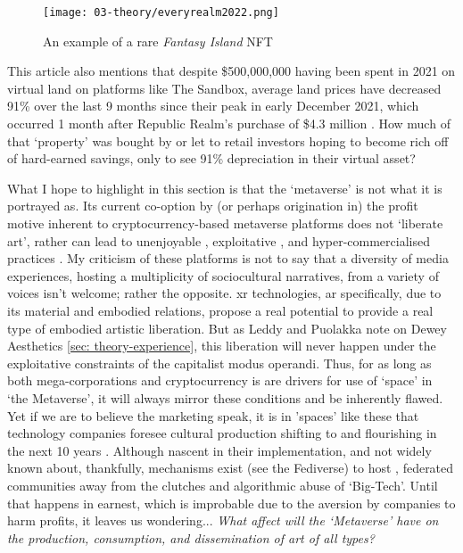 \begin{wrapfigure}{L}{0.45\textwidth}
    \vspace{-\intextsep}
    \begin{minipage}{0.95\linewidth}
        \texttt{[image: 03-theory/everyrealm2022.png]}
        \captionsetup{justification=justified}
        \caption{An example of a rare \textit{Fantasy Island} NFT \citep[from][]{everyrealm2022}}\label{fig: everyrealm2022}
    \end{minipage}
    \hfill
\end{wrapfigure}

This article also mentions that despite \$500,000,000 having been spent in 2021 on virtual land on platforms like The Sandbox, average land prices have decreased 91\% over the last 9 months since their peak in early December 2021, which occurred 1 month after Republic Realm's purchase of \$4.3 million \citep[]{kane2022}. How much of that `property' was bought by or let to retail investors hoping to become rich off of hard-earned savings, only to see 91\% depreciation in their virtual asset? 

What I hope to highlight in this section is that the `metaverse' is not what it is portrayed as. Its current co-option by (or perhaps origination in) the profit motive inherent to cryptocurrency-based metaverse platforms does not `liberate art', rather can lead to unenjoyable \citep{dejesus2022,delic2022}, exploitative , and hyper-commercialised practices \citep[]{ledesma2021,ongwesojr.2022,gach2022}. My criticism of these platforms is not to say that a diversity of media experiences, hosting a multiplicity of sociocultural narratives, from a variety of voices isn't welcome; rather the opposite. \gls{xr} technologies, \gls{ar} specifically, due to its material and embodied relations, propose a real potential to provide a real type of embodied artistic liberation. But as Leddy and Puolakka note on Dewey Aesthetics \autoref{sec: theory-experience}, this liberation will never happen under the exploitative constraints of the capitalist modus operandi. Thus, for as long as both mega-corporations and cryptocurrency is are drivers for use of `space' in `the Metaverse', it will always mirror these conditions and be inherently flawed. Yet if we are to believe the marketing speak, it is in 'spaces' like these that technology companies foresee cultural production shifting to and flourishing in the next 10 years \citep[]{fatemi2022}. Although nascent in their implementation, and not widely known about, thankfully, mechanisms exist (see the Fediverse) to host , federated communities away from the clutches and algorithmic abuse of `Big-Tech'. Until that happens in earnest, which is improbable due to the aversion by companies to harm profits, it leaves us wondering... \textit{What affect will the `Metaverse' have on the production, consumption, and dissemination of art of all types?}

